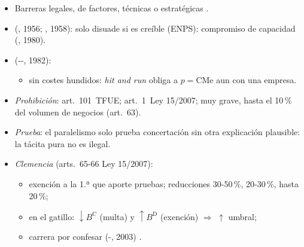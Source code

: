 \documentclass{article}
\begin{document}
\begin{columnas}
\begin{itemize}
\item Barreras legales, de factores, técnicas o estratégicas .
\item {} (, 1956; , 1958): solo disuade si es creíble (ENPS): compromiso de capacidad (, 1980).
\item {} (--, 1982):
  \begin{itemize}
  \item sin costes hundidos: \emph{hit and run} obliga a $p=\mathrm{CMe}$ aun con una empresa.
  \end{itemize}
\end{itemize}
\begin{itemize}
\item \emph{Prohibición}: art.~101~TFUE; art.~1~Ley 15/2007; muy grave, hasta el 10\,\% del volumen de negocios (art.~63).
\item \emph{Prueba}: el paralelismo solo prueba concertación sin otra explicación plausible: la tácita pura no es ilegal.
\item \emph{Clemencia} (arts.~65-66 Ley 15/2007):
  \begin{itemize}
  \item exención a la 1.ª que aporte pruebas; reducciones 30-50\,\%, 20-30\,\%, hasta 20\,\%;
  \item en el gatillo: $\downarrow B^{\mathrm C}$ (multa) y $\uparrow B^{\mathrm D}$ (exención) $\Rightarrow$ $\uparrow$ umbral;
  \item carrera por confesar (-, 2003) .
  \end{itemize}
\end{itemize}


\end{columnas}
\end{document}
